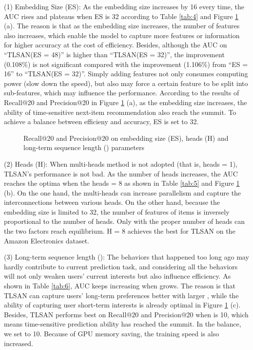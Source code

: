 \documentclass[preprint,12pt]{elsarticle}
\newcommand{\tool}{TLSAN\xspace}
\begin{document}
\begin{sloppypar}
(1) Embedding Size (ES): As the embedding size increases by 16 every time, the AUC rises and plateaus when ES is 32 according to Table \ref{tab:4} and Figure \ref{fig:6} (a). The reason is that as the embedding size increases, the number of features also increases, which enable the model to capture more features or information for higher accuracy at the cost of efficiency. Besides, although the AUC on ``\tool (ES = 48)'' is higher than ``\tool (ES = 32)'', the improvement (0.108\%) is not significant compared with the improvement (1.106\%) from ``ES = 16'' to ``\tool (ES = 32)''. Simply adding features not only consumes computing power (slow down the speed), but also may force a certain feature to be split into sub-features, which may influence the performance. According to the results of Recall@20 and Precision@20 in Figure \ref{fig:6} (a), as the embedding size increases, the ability of time-sensitive next-item recommendation also reach the summit. To achieve a balance between efficieny and accuracy, ES is set to 32.

\begin{figure}
	\centering
	\caption{Recall@20 and Precision@20 on embedding size (ES), heads (H) and long-term sequence length () parameters}\label{fig:6}
\end{figure}

(2) Heads (H): When multi-heads method is not adopted (that is, heads = 1), \tool's performance is not bad. As the number of heads increases, the AUC reaches the optima when the heads = 8 as shown in Table \ref{tab:5} and Figure \ref{fig:6} (b). On the one hand, the multi-heads can increase parallelism and capture the interconnections between various heads. On the other hand, because the embedding size is limited to 32, the number of features of items is inversely proportional to the number of heads. Only with the proper number of heads can the two factors reach equilibrium. H = 8 achieves the best for \tool on the Amazon Electronics dataset.

(3) Long-term sequence length (): The behaviors that happened too long ago may hardly contribute to current prediction task, and considering all the behaviors will not only weaken users' current interests but also influence efficiency. As shown in Table \ref{tab:6}, AUC keeps increasing when  grows. The reason is that \tool can capture users' long-term preferences better with larger , while the ability of capturing user short-term interests is already optimal in Figure \ref{fig:6} (c). Besides, \tool performs best on Recall@20 and Precision@20 when  is 10, which means time-sensitive prediction ability has reached the summit. In the balance, we set  to 10. Because of GPU memory saving, the training speed is also increased.


\end{sloppypar}
\end{document}

